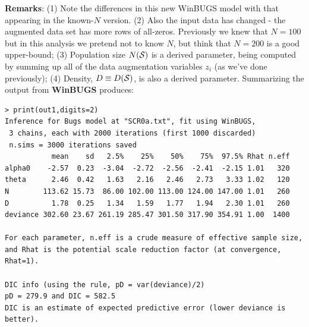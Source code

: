 {\bf Remarks}:  (1) Note the differences in this new WinBUGS model
with that appearing in the known-$N$ version.  (2) Also the input data
has changed - the augmented data set has more rows of
all-zeros. Previously we knew that $N=100$ but in this analysis we
pretend not to know $N$, but think that $N=200$ is a good upper-bound;
(3) Population size $N({\cal S})$ is a derived parameter, being computed by
summing up all of the data augmentation variables $z_{i}$ (as we've
done previously); (4) Density, $D\equiv D({\cal S})$, is also a derived
parameter. Summarizing the output from {\bf WinBUGS} produces: 
{\small
\begin{verbatim}
> print(out1,digits=2)
Inference for Bugs model at "SCR0a.txt", fit using WinBUGS,
 3 chains, each with 2000 iterations (first 1000 discarded)
 n.sims = 3000 iterations saved
           mean    sd   2.5%    25%    50%    75%  97.5% Rhat n.eff
alpha0    -2.57  0.23  -3.04  -2.72  -2.56  -2.41  -2.15 1.01   320
theta      2.46  0.42   1.63   2.16   2.46   2.73   3.33 1.02   120
N        113.62 15.73  86.00 102.00 113.00 124.00 147.00 1.01   260
D          1.78  0.25   1.34   1.59   1.77   1.94   2.30 1.01   260
deviance 302.60 23.67 261.19 285.47 301.50 317.90 354.91 1.00  1400

For each parameter, n.eff is a crude measure of effective sample size,
and Rhat is the potential scale reduction factor (at convergence, Rhat=1).

DIC info (using the rule, pD = var(deviance)/2)
pD = 279.9 and DIC = 582.5
DIC is an estimate of expected predictive error (lower deviance is better).
\end{verbatim}
}

